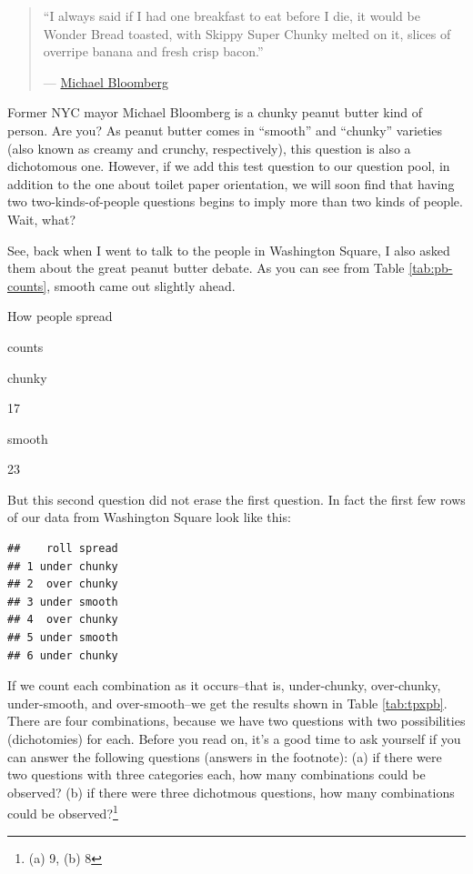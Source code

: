 \documentclass[]{book}
\let\rmarkdownfootnote\footnote%
\def\footnote{\protect\rmarkdownfootnote}
\begin{document}
\begin{quote}
``I always said if I had one breakfast to eat before I die, it would be Wonder Bread toasted, with Skippy Super Chunky melted on it, slices of overripe banana and fresh crisp bacon.''

--- \href{https://nypost.com/2008/07/26/mayors-last-meal-is-a-killer/}{Michael Bloomberg}
\end{quote}

Former NYC mayor Michael Bloomberg is a chunky peanut butter kind of person. Are you? As peanut butter comes in ``smooth'' and ``chunky'' varieties (also known as creamy and crunchy, respectively), this question is also a dichotomous one. However, if we add this test question to our question pool, in addition to the one about toilet paper orientation, we will soon find that having two two-kinds-of-people questions begins to imply more than two kinds of people. Wait, what?

See, back when I went to talk to the people in Washington Square, I also asked them about the great peanut butter debate. As you can see from Table \ref{tab:pb-counts}, smooth came out slightly ahead.

\label{tab:pb-counts}How people spread

counts

chunky

17

smooth

23

But this second question did not erase the first question. In fact the first few rows of our data from Washington Square look like this:

\begin{verbatim}
##    roll spread
## 1 under chunky
## 2  over chunky
## 3 under smooth
## 4  over chunky
## 5 under smooth
## 6 under chunky
\end{verbatim}

If we count each combination as it occurs--that is, under-chunky, over-chunky, under-smooth, and over-smooth--we get the results shown in Table \ref{tab:tpxpb}. There are four combinations, because we have two questions with two possibilities (dichotomies) for each. Before you read on, it's a good time to ask yourself if you can answer the following questions (answers in the footnote): (a) if there were two questions with three categories each, how many combinations could be observed? (b) if there were three dichotmous questions, how many combinations could be observed?\footnote{(a) 9, (b) 8}
\end{document}
